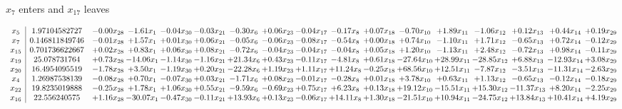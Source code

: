 \documentclass[9pt]{article}
\begin{document}
 $ x_{7} $ enters and $ x_{17} $ leaves 

 \[\begin{array}{c| c c@{\hskip 2pt} c@{\hskip 2pt} c@{\hskip 2pt} c@{\hskip 2pt} c@{\hskip 2pt} c@{\hskip 2pt} c@{\hskip 2pt} c@{\hskip 2pt} c@{\hskip 2pt} c@{\hskip 2pt} c@{\hskip 2pt} c@{\hskip 2pt} c@{\hskip 2pt} c@{\hskip 2pt} c@{\hskip 2pt} }
 x_{5}   &  1.97104582727 & -0.00 x_{28} & -1.61 x_{1} & -0.04 x_{30} & -0.03 x_{21} & -0.30 x_{6} & +  0.06 x_{23} & -0.04 x_{17} & -0.17 x_{8} & +  0.07 x_{18} & -0.70 x_{10} & +  1.89 x_{11} & -1.06 x_{12} & +  0.12 x_{13} & +  0.44 x_{14} & +  0.19 x_{29}\\
 x_{7}   &  0.146811849746 & -0.01 x_{28} & +  1.57 x_{1} & +  0.01 x_{30} & +  0.06 x_{21} & -0.05 x_{6} & -0.06 x_{23} & -0.08 x_{17} & -0.54 x_{8} & +  0.00 x_{18} & +  0.74 x_{10} & -1.10 x_{11} & +  1.71 x_{12} & -0.65 x_{13} & +  0.72 x_{14} & -0.12 x_{29}\\
 x_{15}   &  0.701736622667 & +  0.02 x_{28} & +  0.83 x_{1} & +  0.06 x_{30} & +  0.08 x_{21} & -0.72 x_{6} & -0.04 x_{23} & -0.04 x_{17} & -0.04 x_{8} & +  0.05 x_{18} & +  1.20 x_{10} & -1.13 x_{11} & +  2.48 x_{12} & -0.72 x_{13} & +  0.98 x_{14} & -0.11 x_{29}\\
 x_{19}   &  25.078731764 & +  0.73 x_{28} & -14.06 x_{1} & -1.14 x_{30} & -1.16 x_{21} & + 21.34 x_{6} & +  0.43 x_{23} & -0.11 x_{17} & -4.81 x_{8} & +  0.61 x_{18} & -27.64 x_{10} & + 28.99 x_{11} & -28.85 x_{12} & +  6.88 x_{13} & -12.93 x_{14} & +  3.08 x_{29}\\
 x_{20}   &  16.4954095519 & -1.78 x_{28} & +  3.50 x_{1} & -1.19 x_{30} & +  0.20 x_{21} & -22.28 x_{6} & +  1.19 x_{23} & +  1.11 x_{17} & + 11.24 x_{8} & -0.25 x_{18} & + 68.56 x_{10} & + 12.51 x_{11} & -7.87 x_{12} & -3.51 x_{13} & -11.31 x_{14} & -2.63 x_{29}\\
 x_{4}   &  1.26987538139 & -0.08 x_{28} & +  0.70 x_{1} & -0.07 x_{30} & +  0.03 x_{21} & -1.71 x_{6} & +  0.08 x_{23} & -0.01 x_{17} & -0.28 x_{8} & +  0.01 x_{18} & +  3.78 x_{10} & +  0.63 x_{11} & +  1.13 x_{12} & -0.65 x_{13} & -0.12 x_{14} & -0.18 x_{29}\\
 x_{22}   &  19.8235019888 & -0.25 x_{28} & +  1.78 x_{1} & +  1.06 x_{30} & +  0.55 x_{21} & -9.59 x_{6} & -0.69 x_{23} & +  0.75 x_{17} & +  6.23 x_{8} & +  0.13 x_{18} & + 19.12 x_{10} & -15.51 x_{11} & + 15.30 x_{12} & -11.37 x_{13} & +  8.20 x_{14} & -2.25 x_{29}\\
 x_{16}   &  22.556240575 & +  1.16 x_{28} & -30.07 x_{1} & -0.47 x_{30} & -0.11 x_{21} & + 13.93 x_{6} & +  0.13 x_{23} & -0.06 x_{17} & + 14.11 x_{8} & +  1.30 x_{18} & -21.51 x_{10} & + 10.94 x_{11} & -24.75 x_{12} & + 13.84 x_{13} & + 10.41 x_{14} & +  4.19 x_{29}\\

\end{array}\]
\end{document}
